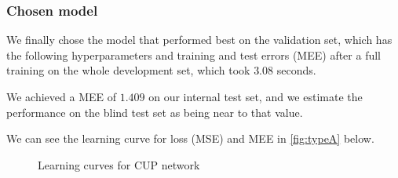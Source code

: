 \subsubsection{Chosen model}

We finally chose the model that performed best on the validation set, which has the following hyperparameters and training and test errors (MEE) after a full training on the whole development set, which took $3.08$ seconds.

\begin{table}[htb]
    \centering
    \caption{Hyperparameters and training and test error of the chosen model after a full training on the whole development set}
    \label{table:final_train_results}
\end{table}
We achieved a MEE of $1.409$ on our internal test set, and we estimate the performance on the blind test set as being near to that value.

We can see the learning curve for loss (MSE) and MEE in \cref{fig:typeA} below.

\begin{figure}[h]
    \centering
    \caption{Learning curves for CUP network}
\end{figure}

